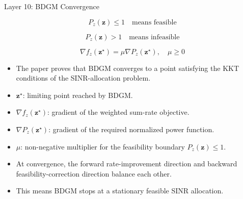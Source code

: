 \documentclass{beamer}
\begin{document}
\begin{frame}{Layer 10: BDGM Convergence}
\scriptsize

\[
P_z(\mathbf{z})\le1
\quad \text{means feasible}
\]

\[
P_z(\mathbf{z})>1
\quad \text{means infeasible}
\]

\[
\nabla f_z(\mathbf{z}^{\star})
=
\mu \nabla P_z(\mathbf{z}^{\star}),
\quad \mu\ge0
\]

\begin{itemize}
    \item The paper proves that BDGM converges to a point satisfying the KKT conditions of the SINR-allocation problem.

    \item \(\mathbf{z}^{\star}\): limiting point reached by BDGM.

    \item \(\nabla f_z(\mathbf{z}^{\star})\): gradient of the weighted sum-rate objective.

    \item \(\nabla P_z(\mathbf{z}^{\star})\): gradient of the required normalized power function.

    \item \(\mu\): non-negative multiplier for the feasibility boundary \(P_z(\mathbf{z})\le1\).

    \item At convergence, the forward rate-improvement direction and backward feasibility-correction direction balance each other.

    \item This means BDGM stops at a stationary feasible SINR allocation.
\end{itemize}

\end{frame}
\end{document}
